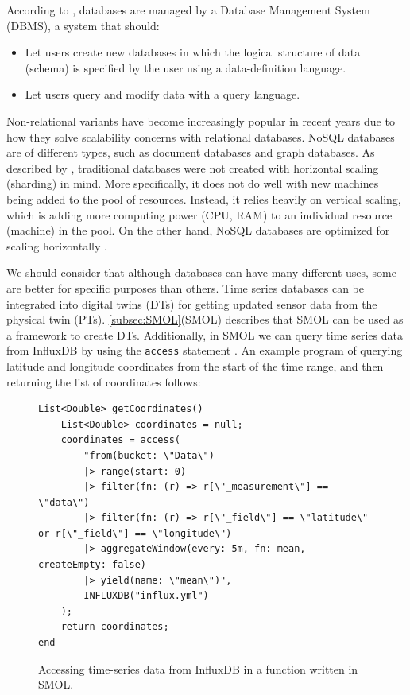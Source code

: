 \documentclass{article}
\begin{document}
According to \citeauthor{garcia-molina_database_2002}, databases are managed by a Database Management System (DBMS), a system that should:
\begin{itemize}
    \item Let users create new databases in which the logical structure of data (schema) is specified by the user using a data-definition language.
    \item Let users query and modify data with a query language.
\end{itemize}

Non-relational variants have become increasingly popular in recent years due to how they solve scalability concerns with relational databases. NoSQL databases are of different types, such as document databases and graph databases. As described by \citeauthor{mohamed_relational_2014}, traditional databases were not created with horizontal scaling (sharding) in mind. More specifically, it does not do well with new machines being added to the pool of resources. Instead, it relies heavily on vertical scaling, which is adding more computing power (CPU, RAM) to an individual resource (machine) in the pool. On the other hand, NoSQL databases are optimized for scaling horizontally \cite{mohamed_relational_2014, kim_geoycsb_2023}.

We should consider that although databases can have many different uses, some are better for specific purposes than others. Time series databases can be integrated into digital twins (DTs) for getting updated sensor data from the physical twin (PTs). \ref{subsec:SMOL}(SMOL) describes that SMOL can be used as a framework to create DTs. Additionally, in SMOL we can query time series data from InfluxDB by using the \verb|access| statement \cite{noauthor_time_nodate}. An example program of querying latitude and longitude coordinates from the start of the time range, and then returning the list of coordinates follows:

\begin{figure}
    \centering
    \begin{Verbatim}[frame=single,breaklines=true]
List<Double> getCoordinates()
    List<Double> coordinates = null;
    coordinates = access(
        "from(bucket: \"Data\")
        |> range(start: 0)
        |> filter(fn: (r) => r[\"_measurement\"] == \"data\")
        |> filter(fn: (r) => r[\"_field\"] == \"latitude\" or r[\"_field\"] == \"longitude\")
        |> aggregateWindow(every: 5m, fn: mean, createEmpty: false)
        |> yield(name: \"mean\")",
        INFLUXDB("influx.yml")
    );
    return coordinates;
end
    \end{Verbatim}
    \caption{Accessing time-series data from InfluxDB in a function written in SMOL.}
    \label{fig:access_time_series}
\end{figure}
    
\end{document}
